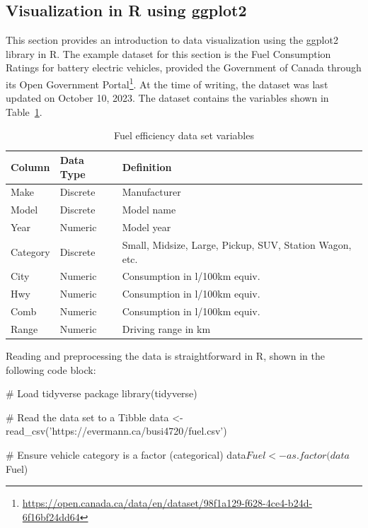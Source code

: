 \begin{withcode}
\section{Visualization in R using ggplot2}

This section provides an introduction to data visualization using the ggplot2 library in R. The example dataset for this section is the Fuel Consumption Ratings for battery electric vehicles, provided the Government of Canada through its Open Government Portal\footnote{\scriptsize\url{https://open.canada.ca/data/en/dataset/98f1a129-f628-4ce4-b24d-6f16bf24dd64}}. At the time of writing, the dataset was last updated on October 10, 2023. The dataset contains the variables shown in Table~\ref{tab:fueldata}.

\begin{table}[h]
\centering
\renewcommand{\arraystretch}{1.25}

\begin{tabularx}{\linewidth}{|l|l|X|} \hline
  {\bf Column} & {\bf Data Type} & {\bf Definition} \\ \hline \hline
  Make & Discrete & Manufacturer \\ 
  Model & Discrete & Model name\\
  Year & Numeric & Model year \\
  Category & Discrete & Small, Midsize, Large, Pickup, SUV, Station Wagon, etc. \\
  City & Numeric & Consumption in l/100km equiv. \\
  Hwy & Numeric & Consumption in l/100km equiv. \\
  Comb & Numeric & Consumption in l/100km equiv. \\
  Range & Numeric & Driving range in km \\ \hline
\end{tabularx}
\caption{Fuel efficiency data set variables}
\label{tab:fueldata}
\end{table}

\noindent Reading and preprocessing the data is straightforward in R, shown in the following code block:

\begin{Rcode}
# Load tidyverse package
library(tidyverse)

# Read the data set to a Tibble
data <- read_csv('https://evermann.ca/busi4720/fuel.csv')

# Ensure vehicle category is a factor (categorical)
data$Fuel <- as.factor(data$Fuel)
\end{Rcode}


\end{withcode}
